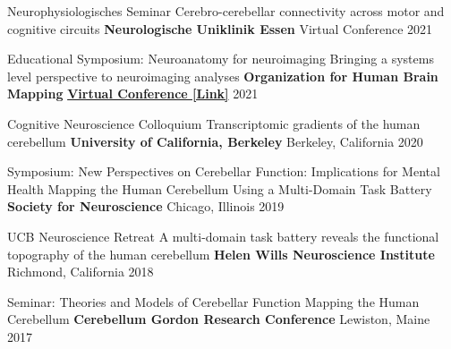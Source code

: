 \begin{cventries}
  \cventry
    {Neurophysiologisches Seminar} %
    {Cerebro-cerebellar connectivity across motor and cognitive circuits} %
    {\textbf{Neurologische Uniklinik Essen}} %
    {Virtual Conference} %
    {2021} %

  \cventry
    {Educational Symposium: Neuroanatomy for neuroimaging} %
    {Bringing a systems level perspective to neuroimaging analyses} %
    {\textbf{Organization for Human Brain Mapping}} %
    {\href{https://www.youtube.com/watch?v=L6nwkvBqJzI}{\textbf{Virtual Conference [Link]}}} %
    {2021} %
    
  \cventry
    {Cognitive Neuroscience Colloquium} %
    {Transcriptomic gradients of the human cerebellum} %
    {\textbf{University of California, Berkeley}} %
    {Berkeley, California} %
    {2020} %

  \cventry
    {Symposium: New Perspectives on Cerebellar Function: Implications for Mental Health} %
    {Mapping the Human Cerebellum Using a Multi-Domain Task Battery} %
    {\textbf{Society for Neuroscience}} %
    {Chicago, Illinois} %
    {2019} %
    
  \cventry
    {UCB Neuroscience Retreat} %
    {A multi-domain task battery reveals the functional topography of the human cerebellum} %
    {\textbf{Helen Wills Neuroscience Institute}}
    {Richmond, California} %
    {2018} %
    
  \cventry
    {Seminar: Theories and Models of Cerebellar Function} %
    {Mapping the Human Cerebellum} %
    {\textbf{Cerebellum Gordon Research Conference}} %
    {Lewiston, Maine} %
    {2017} %
   
\end{cventries}
